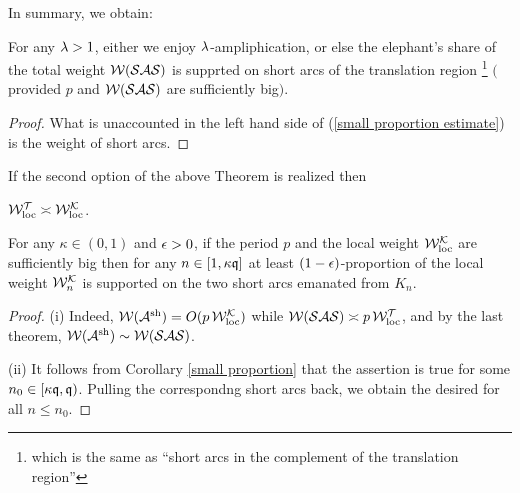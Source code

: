 In summary, we obtain:

\begin{thm}\label{short arcs}
  For any ${\lambda}>1$,  either we enjoy ${\lambda}$-ampliphication,  or else
  the elephant's share of the total weight ${\mathcal W}({\mathcal{SAS}})$ is supprted on
  short arcs of the translation region%
\footnote{which is the same as ``short arcs in the complement of the
  translation region''}
  $($provided $p$ and ${\mathcal W}({\mathcal{SAS}})$ are sufficiently big$)$. 
\end{thm}  

\begin{proof}
  What is unaccounted in the left hand side of
  (\ref{small proportion estimate}) is the weight of short arcs.
\end{proof}  

\begin{cor}\label{loc weights comparison} 
If the second option of the above Theorem is realized then 
  
\ssk{} 
${\mathcal W}_{\mathrm{loc}}^{\mathcal T}\asymp {\mathcal W}_{\mathrm{loc}}^{\mathcal K}$. 

\ssk{}
For any $\kappa\in (0,1)$ and ${\epsilon}>0$,
if the period $p$ and the  local weight ${\mathcal W}_{\mathrm{loc}}^{\mathcal K}$ are sufficiently big
then for any $n \in [1,\kappa {\mathfrak{q}}] $
at least $ (1-{\epsilon}) $-proportion of the local weight ${\mathcal W}_n^{\mathcal K}$ is supported on
the two short arcs emanated from $K_n$.  
%
\end{cor}


\begin{proof}
(i)   Indeed, ${\mathcal W}({\mathcal A}^{\mathrm{sh}}) = O(p\, {\mathcal W}_{\mathrm{loc}}^{\mathcal K})$
  while ${\mathcal W}({\mathcal{SAS}}) \asymp p\, {\mathcal W}_{\mathrm{loc}}^{\mathcal T} $, and
  by   the last theorem, ${\mathcal W}({\mathcal A}^{\mathrm{sh}}) \sim {\mathcal W}({\mathcal{SAS}}) $. 

  \msk (ii) It follows from Corollary \ref{small proportion}
  that the assertion is true for some $n_0\in [\kappa {\mathfrak{q}}, {\mathfrak{q}})$.
  Pulling the correspondng  short arcs back, we obtain the desired for all $n\leq n_0$. 
\end{proof}  



%

